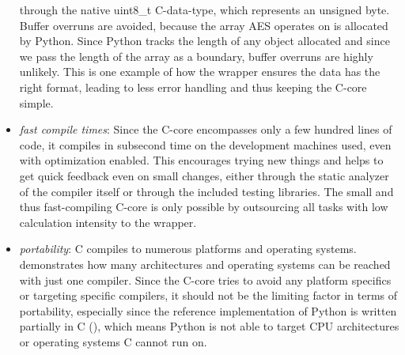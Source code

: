 \begin{itemize}
  through the native uint8\_t C-data-type, which represents an unsigned
  byte. Buffer overruns are avoided, because the array AES operates on
  is allocated by Python. Since Python tracks the length of any object
  allocated and since we pass the length of the array as a boundary,
  buffer overruns are highly unlikely. This is one example of how the
  wrapper ensures the data has the right format, leading to less error
  handling and thus keeping the C-core simple.
\item
  \emph{fast compile times}: Since the C-core encompasses only a few
  hundred lines of code, it compiles in subsecond time on the development
  machines used, even with optimization enabled. This encourages trying new
  things and helps to get quick feedback even on small changes, either
  through the static analyzer of the compiler itself or through the
  included testing libraries. The small and thus fast-compiling C-core
  is only possible by outsourcing all tasks with low calculation intensity to
  the wrapper.
\item
  \emph{portability}: C compiles to numerous platforms and operating
  systems. \cite{gccsys} demonstrates how
  many architectures and operating systems can be reached with just one
  compiler. Since the C-core tries to avoid any platform specifics or
  targeting specific compilers, it should not be the limiting factor in
  terms of portability, especially since the reference implementation of
  Python is written partially in C (\cite{pyref}),
  which means Python is not able to target CPU architectures or
  operating systems C cannot run on.
\end{itemize}

